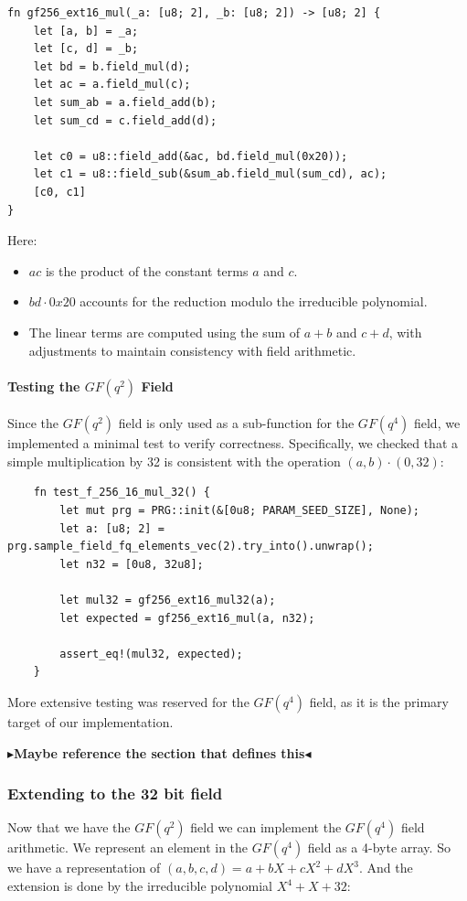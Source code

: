 \documentclass[11pt]{report}
\theoremstyle{definition}
\theoremstyle{plain}
\newcommand{\todo}[1]{{\color[rgb]{.5,0,0}\textbf{$\blacktriangleright$#1$\blacktriangleleft$}}}
\begin{document}
\begin{verbatim}
fn gf256_ext16_mul(_a: [u8; 2], _b: [u8; 2]) -> [u8; 2] {
    let [a, b] = _a;
    let [c, d] = _b;
    let bd = b.field_mul(d);
    let ac = a.field_mul(c);
    let sum_ab = a.field_add(b);
    let sum_cd = c.field_add(d);

    let c0 = u8::field_add(&ac, bd.field_mul(0x20));
    let c1 = u8::field_sub(&sum_ab.field_mul(sum_cd), ac);
    [c0, c1]
}
\end{verbatim}

Here:
\begin{itemize}
  \item $ac$ is the product of the constant terms $a$ and $c$.
  \item $bd \cdot 0x20$ accounts for the reduction modulo the irreducible polynomial.
  \item The linear terms are computed using the sum of $a+b$ and $c+d$, with adjustments to maintain consistency with field arithmetic.
\end{itemize}

\paragraph{Testing the $GF(q^2)$ Field}

Since the $GF(q^2)$ field is only used as a sub-function for the $GF(q^4)$ field, we implemented a minimal test to verify correctness. Specifically, we checked that a simple multiplication by 32 is consistent with the operation $(a, b) \cdot (0, 32)$:

\begin{verbatim}
    fn test_f_256_16_mul_32() {
        let mut prg = PRG::init(&[0u8; PARAM_SEED_SIZE], None);
        let a: [u8; 2] = prg.sample_field_fq_elements_vec(2).try_into().unwrap();
        let n32 = [0u8, 32u8];

        let mul32 = gf256_ext16_mul32(a);
        let expected = gf256_ext16_mul(a, n32);

        assert_eq!(mul32, expected);
    }
\end{verbatim}

More extensive testing was reserved for the $GF(q^4)$ field, as it is the primary target of our implementation.

\todo{Maybe reference the section that defines this}

\subsubsection{Extending to the 32 bit field}\label{sec:gf_256_32_bit_field} %
Now that we have the $GF(q^2)$ field we can implement the $GF(q^4)$ field arithmetic. We represent an element in the $GF(q^4)$ field as a 4-byte array. So we have a representation of $(a,b,c,d) = a + bX + cX^2 + dX^3$. And the extension is done by the irreducible polynomial $X^4 + X + 32$:
\end{document}
